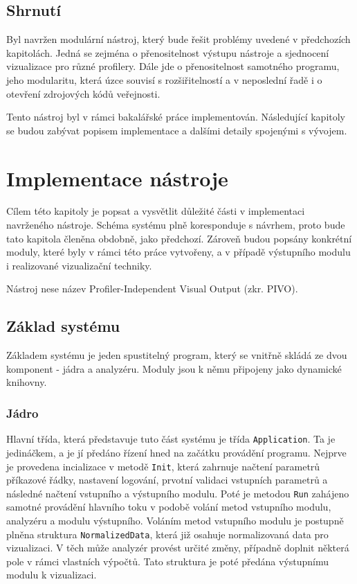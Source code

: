 \documentclass[czech,BP]{thesiskiv}
\begin{document}
\section{Shrnutí}

Byl navržen modulární nástroj, který bude řešit problémy uvedené v předchozích kapitolách. Jedná se zejména o přenositelnost výstupu nástroje a sjednocení vizualizace pro různé profilery. Dále jde o přenositelnost samotného programu, jeho modularitu, která úzce souvisí s rozšiřitelností a v neposlední řadě i o otevření zdrojových kódů veřejnosti.

Tento nástroj byl v rámci bakalářské práce implementován. Následující kapitoly se budou zabývat popisem implementace a dalšími detaily spojenými s vývojem.


\newpage

\chapter{Implementace nástroje}

Cílem této kapitoly je popsat a vysvětlit důležité části v implementaci navrženého nástroje. Schéma systému plně koresponduje s návrhem, proto bude tato kapitola členěna obdobně, jako předchozí. Zároveň budou popsány konkrétní moduly, které byly v rámci této práce vytvořeny, a v případě výstupního modulu i realizované vizualizační techniky.

Nástroj nese název Profiler-Independent Visual Output (zkr. PIVO).

\section{Základ systému}

Základem systému je jeden spustitelný program, který se vnitřně skládá ze dvou komponent - jádra a analyzéru. Moduly jsou k němu připojeny jako dynamické knihovny.

\subsection{Jádro}

Hlavní třída, která představuje tuto část systému je třída \texttt{Application}. Ta je jedináčkem, a je jí předáno řízení hned na začátku provádění programu. Nejprve je provedena incializace v metodě \texttt{Init}, která zahrnuje načtení parametrů příkazové řádky, nastavení logování, prvotní validaci vstupních parametrů a následné načtení vstupního a výstupního modulu. Poté je metodou \texttt{Run} zahájeno samotné provádění hlavního toku v podobě volání metod vstupního modulu, analyzéru a modulu výstupního. Voláním metod vstupního modulu je postupně plněna struktura \texttt{NormalizedData}, která již osahuje normalizovaná data pro vizualizaci. V těch může analyzér provést určité změny, případně doplnit některá pole v rámci vlastních výpočtů. Tato struktura je poté předána výstupnímu modulu k vizualizaci.
\end{document}
